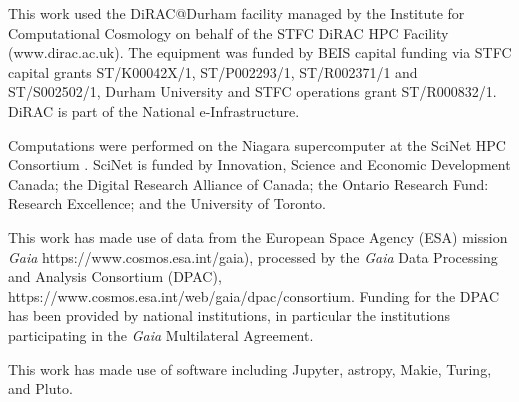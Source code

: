 This work used the DiRAC@Durham facility managed by the Institute for
Computational Cosmology on behalf of the STFC DiRAC HPC Facility
(www.dirac.ac.uk). The equipment was funded by BEIS capital funding via
STFC capital grants ST/K00042X/1, ST/P002293/1, ST/R002371/1 and
ST/S002502/1, Durham University and STFC operations grant ST/R000832/1.
DiRAC is part of the National e-Infrastructure.

Computations were performed on the Niagara supercomputer
\citep{ponce+2019} at the SciNet HPC Consortium \citep{loken+2010}.
SciNet is funded by Innovation, Science and Economic Development Canada;
the Digital Research Alliance of Canada; the Ontario Research Fund:
Research Excellence; and the University of Toronto.

This work has made use of data from the European Space Agency (ESA)
mission \emph{Gaia} https://www.cosmos.esa.int/gaia), processed by the
\emph{Gaia} Data Processing and Analysis Consortium (DPAC),
https://www.cosmos.esa.int/web/gaia/dpac/consortium. Funding for the
DPAC has been provided by national institutions, in particular the
institutions participating in the \emph{Gaia} Multilateral Agreement.

This work has made use of software including Jupyter, astropy, Makie,
Turing, and Pluto.

